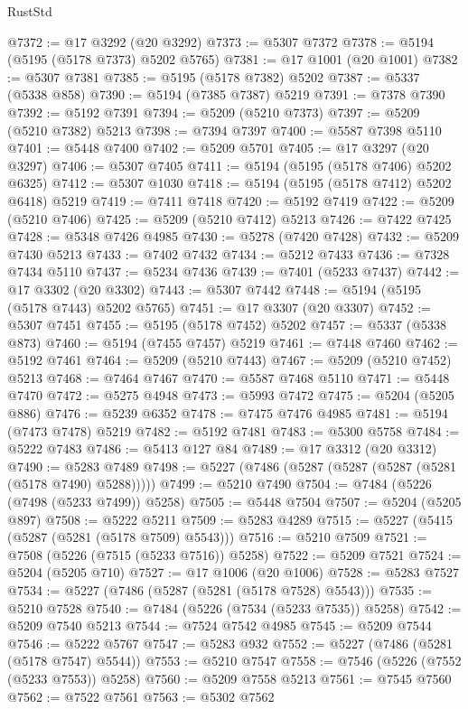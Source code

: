 \begin{lexlean}{RustStd}
\begin{coremodule}
@7372 := @17 @3292 (@20 @3292)
@7373 := @5307 @7372
@7378 := @5194 (@5195 (@5178 @7373) @5202 @5765)
@7381 := @17 @1001 (@20 @1001)
@7382 := @5307 @7381
@7385 := @5195 (@5178 @7382) @5202
@7387 := @5337 (@5338 @858)
@7390 := @5194 (@7385 @7387) @5219
@7391 := @7378 @7390
@7392 := @5192 @7391
@7394 := @5209 (@5210 @7373)
@7397 := @5209 (@5210 @7382) @5213
@7398 := @7394 @7397
@7400 := @5587 @7398 @5110
@7401 := @5448 @7400
@7402 := @5209 @5701
@7405 := @17 @3297 (@20 @3297)
@7406 := @5307 @7405
@7411 := @5194 (@5195 (@5178 @7406) @5202 @6325)
@7412 := @5307 @1030
@7418 := @5194 (@5195 (@5178 @7412) @5202 @6418) @5219
@7419 := @7411 @7418
@7420 := @5192 @7419
@7422 := @5209 (@5210 @7406)
@7425 := @5209 (@5210 @7412) @5213
@7426 := @7422 @7425
@7428 := @5348 @7426 @4985
@7430 := @5278 (@7420 @7428)
@7432 := @5209 @7430 @5213
@7433 := @7402 @7432
@7434 := @5212 @7433
@7436 := @7328 @7434 @5110
@7437 := @5234 @7436
@7439 := @7401 (@5233 @7437)
@7442 := @17 @3302 (@20 @3302)
@7443 := @5307 @7442
@7448 := @5194 (@5195 (@5178 @7443) @5202 @5765)
@7451 := @17 @3307 (@20 @3307)
@7452 := @5307 @7451
@7455 := @5195 (@5178 @7452) @5202
@7457 := @5337 (@5338 @873)
@7460 := @5194 (@7455 @7457) @5219
@7461 := @7448 @7460
@7462 := @5192 @7461
@7464 := @5209 (@5210 @7443)
@7467 := @5209 (@5210 @7452) @5213
@7468 := @7464 @7467
@7470 := @5587 @7468 @5110
@7471 := @5448 @7470
@7472 := @5275 @4948
@7473 := @5993 @7472
@7475 := @5204 (@5205 @886)
@7476 := @5239 @6352
@7478 := @7475 @7476 @4985
@7481 := @5194 (@7473 @7478) @5219
@7482 := @5192 @7481
@7483 := @5300 @5758
@7484 := @5222 @7483
@7486 := @5413 @127 @84
@7489 := @17 @3312 (@20 @3312)
@7490 := @5283 @7489
@7498 := @5227 (@7486 (@5287 (@5287 (@5287 (@5281 (@5178 @7490) @5288)))))
@7499 := @5210 @7490
@7504 := @7484 (@5226 (@7498 (@5233 @7499)) @5258)
@7505 := @5448 @7504
@7507 := @5204 (@5205 @897)
@7508 := @5222 @5211
@7509 := @5283 @4289
@7515 := @5227 (@5415 (@5287 (@5281 (@5178 @7509) @5543)))
@7516 := @5210 @7509
@7521 := @7508 (@5226 (@7515 (@5233 @7516)) @5258)
@7522 := @5209 @7521
@7524 := @5204 (@5205 @710)
@7527 := @17 @1006 (@20 @1006)
@7528 := @5283 @7527
@7534 := @5227 (@7486 (@5287 (@5281 (@5178 @7528) @5543)))
@7535 := @5210 @7528
@7540 := @7484 (@5226 (@7534 (@5233 @7535)) @5258)
@7542 := @5209 @7540 @5213
@7544 := @7524 @7542 @4985
@7545 := @5209 @7544
@7546 := @5222 @5767
@7547 := @5283 @932
@7552 := @5227 (@7486 (@5281 (@5178 @7547) @5544))
@7553 := @5210 @7547
@7558 := @7546 (@5226 (@7552 (@5233 @7553)) @5258)
@7560 := @5209 @7558 @5213
@7561 := @7545 @7560
@7562 := @7522 @7561
@7563 := @5302 @7562

\end{coremodule}
\end{lexlean}
